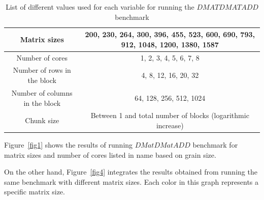 \vspace{\baselineskip}	
\begin{table}[H]
	\centering
		\resizebox{\textwidth}{!}
		{\begin{tabular}{|c | c |} 
			\hline
			Matrix sizes & 200, 230, 264, 300, 396, 455, 523, 600, 690, 793, 912, 1048, 1200, 1380, 1587 \\ [0.5ex] 
			\hline
			Number of cores & 1, 2, 3, 4, 5, 6, 7, 8 \\ 	
			\hline
			Number of rows in the block & 4, 8, 12, 16, 20, 32 \\
			\hline	
			Number of columns in the block & 64, 128, 256, 512, 1024 \\
			\hline
			Chunk size & Between 1 and total number of blocks (logarithmic increase)\\\hline
		\end{tabular}}

		\caption{List of different values used for each variable for running the $DMATDMATADD$ benchmark}
		\label{table1}
\end{table}

\vspace{\baselineskip}	
Figure~\ref{fig1} shows the results of running $DMatDMatADD$ benchmark for matrix sizes and number of cores listed in \tablename{name} based on grain size. 

On the other hand, Figure~\ref{fig4} integrates the results obtained from running the same benchmark with different matrix sizes. Each color in this graph represents a specific matrix size. 

